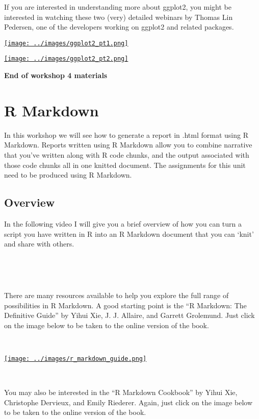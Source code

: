 \documentclass[
]{book}
\begin{document}
If you are interested in understanding more about ggplot2, you might be interested in watching these two (very) detailed webinars by Thomas Lin Pedersen, one of the developers working on ggplot2 and related packages.

\href{https://youtu.be/h29g21z0a68}{\texttt{[image: ../images/ggplot2\_pt1.png]}}

\href{https://youtu.be/0m4yywqNPVY}{\texttt{[image: ../images/ggplot2\_pt2.png]}}

\textbf{End of workshop 4 materials}

\hypertarget{r-markdown}{%
\chapter{R Markdown}\label{r-markdown}}

In this workshop we will see how to generate a report in .html format using R Markdown. Reports written using R Markdown allow you to combine narrative that you've written along with R code chunks, and the output associated with those code chunks all in one knitted document. The assignments for this unit need to be produced using R Markdown.

\hypertarget{overview}{%
\section{Overview}\label{overview}}

In the following video I will give you a brief overview of how you can turn a script you have written in R into an R Markdown document that you can `knit' and share with others.

~~

~~

There are many resources available to help you explore the full range of possibilities in R Markdown. A good starting point is the ``R Markdown: The Definitive Guide'' by Yihui Xie, J. J. Allaire, and Garrett Grolemund. Just click on the image below to be taken to the online version of the book.

~~

\href{https://bookdown.org/yihui/rmarkdown/}{\texttt{[image: ../images/r\_markdown\_guide.png]}}

~~

You may also be interested in the ``R Markdown Cookbook'' by Yihui Xie, Christophe Dervieux, and Emily Riederer. Again, just click on the image below to be taken to the online version of the book.
\end{document}
